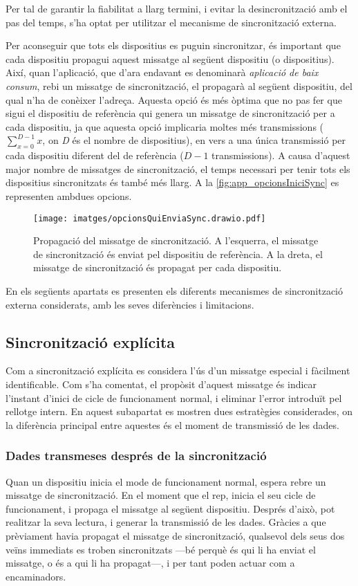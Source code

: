 \documentclass{tfgitic}[2024/07/01]
\begin{document}
{Per tal de garantir la fiabilitat a llarg termini, i evitar la desincronització amb el pas del temps, s'ha optat per utilitzar el mecanisme de sincronització externa. 

Per aconseguir que tots els dispositius es puguin sincronitzar, és important que cada dispositiu propagui aquest missatge al següent dispositiu (o dispositius). Així, quan l'aplicació, que d'ara endavant es denominarà \emph{aplicació de baix consum}, rebi un missatge de sincronització, el propagarà al següent dispositiu, del qual n'ha de conèixer l'adreça. Aquesta opció és més òptima que no pas fer que sigui el dispositiu de referència qui genera un missatge de sincronització per a cada dispositiu, ja que aquesta opció implicaria moltes més transmissions ($\sum_{x=0}^{D-1}{x}$, on \emph{D} és el nombre de dispositius), en vers a una única transmissió per cada dispositiu diferent del de referència ($D-1$ transmissions). A causa d'aquest major nombre de missatges de sincronització, el temps necessari per tenir tots els dispositius sincronitzats és també més llarg. A la \autoref{fig:app_opcionsIniciSync} es representen ambdues opcions.

\begin{figure}
    \centering
    \texttt{[image: imatges/opcionsQuiEnviaSync.drawio.pdf]}
    \caption{Propagació del missatge de sincronització. A l'esquerra, el missatge de sincronització és enviat pel dispositiu de referència. A la dreta, el missatge de sincronització és propagat per cada dispositiu.}
\label{fig:app_opcionsIniciSync}
\end{figure}

En els següents apartats es presenten els diferents mecanismes de sincronització externa considerats, amb les seves diferències i limitacions.

\subsection{Sincronització explícita}
Com a sincronització explícita es considera l'ús d'un missatge especial i fàcilment identificable. Com s'ha comentat, el propòsit d'aquest missatge és indicar l'instant d'inici de cicle de funcionament normal, i eliminar l'error introduït pel rellotge intern. En aquest subapartat es mostren dues estratègies considerades, on la diferència principal entre aquestes és el moment de transmissió de les dades.

\subsubsection{Dades transmeses després de la sincronització}
Quan un dispositiu inicia el mode de funcionament normal, espera rebre un missatge de sincronització. En el moment que el rep, inicia el seu cicle de funcionament, i propaga el missatge al següent dispositiu. Després d'això, pot realitzar la seva lectura, i generar la transmissió de les dades. Gràcies a que prèviament havia propagat el missatge de sincronització, qualsevol dels seus dos veïns immediats es troben sincronitzats ---bé perquè és qui li ha enviat el missatge, o és a qui li ha propagat---, i per tant poden actuar com a encaminadors.

}
\end{document}
